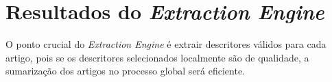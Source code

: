 \section{Resultados do \emph{Extraction Engine}}

O ponto crucial do \emph{Extraction Engine} é extrair descritores válidos para cada artigo, pois se os descritores selecionados localmente são de qualidade, a sumarização dos artigos no processo global será eficiente. 

